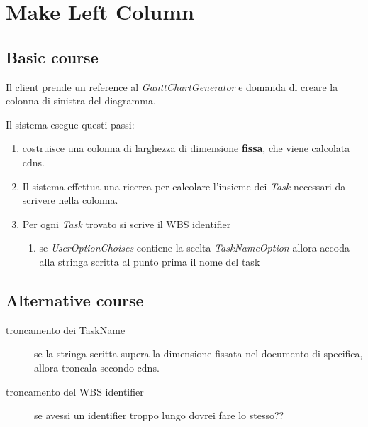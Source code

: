 \section{Make Left Column}
\label{seq:GanttMakeLeftColumn}
\subsection{Basic course}
Il client prende un reference al \emph{GanttChartGenerator} e domanda di creare
la colonna di sinistra del diagramma. 

Il sistema esegue questi passi:
\begin{enumerate}
  \item costruisce una colonna di larghezza di dimensione \textbf{fissa}, che
  viene calcolata cdns.
  \item Il sistema effettua una ricerca per calcolare l'insieme dei \emph{Task}
  necessari da scrivere nella colonna.
  \item Per ogni \emph{Task} trovato si scrive il WBS identifier
  \begin{enumerate}
    \item se \emph{UserOptionChoises} contiene la scelta \emph{TaskNameOption}
    allora accoda alla stringa scritta al punto prima il nome del task
  \end{enumerate}
\end{enumerate}

\subsection{Alternative course}
\begin{description}
  \item[troncamento dei TaskName] se la stringa scritta supera la dimensione
  fissata nel documento di specifica, allora troncala secondo cdns.
\item[troncamento del WBS identifier] se avessi un identifier troppo lungo
dovrei fare lo stesso??
\end{description}